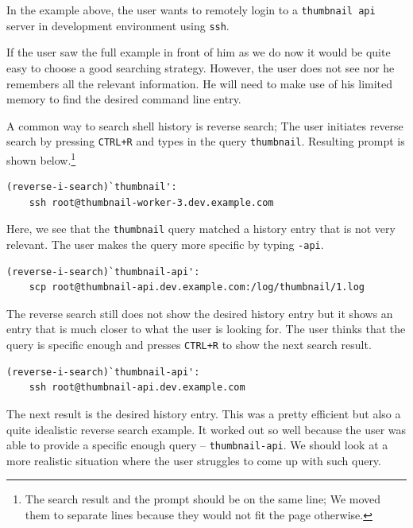 \documentclass[thesis=M,english]{FITthesis}[2012/10/20]
\begin{document}
In the example above, the user wants to remotely login to a \verb|thumbnail api| server in development environment using \verb|ssh|. 

If the user saw the full example in front of him as we do now it would be quite easy to choose a good searching strategy. However, the user does not see nor he remembers all the relevant information. He will need to make use of his limited memory to find the desired command line entry. 

A common way to search shell history is reverse search; The user initiates reverse search by pressing \verb|CTRL+R| and types in the query \verb|thumbnail|. Resulting prompt is shown below.\footnote{The search result and the prompt should be on the same line; We moved them to separate lines because they would not fit the page otherwise.}

\begin{verbatim}
(reverse-i-search)`thumbnail': 
    ssh root@thumbnail-worker-3.dev.example.com
\end{verbatim}

Here, we see that the \verb|thumbnail| query matched a history entry that is not very relevant. The user makes the query more specific by typing \verb|-api|.

\begin{verbatim}
(reverse-i-search)`thumbnail-api': 
    scp root@thumbnail-api.dev.example.com:/log/thumbnail/1.log
\end{verbatim}

The reverse search still does not show the desired history entry but it shows an entry that is much closer to what the user is looking for. The user thinks that the query is specific enough and presses \verb|CTRL+R| to show the next search result.

\begin{verbatim}
(reverse-i-search)`thumbnail-api':
    ssh root@thumbnail-api.dev.example.com
\end{verbatim}

The next result is the desired history entry. This was a pretty efficient but also a quite idealistic reverse search example. It worked out so well because the user was able to provide a specific enough query -- \verb|thumbnail-api|. We should look at a more realistic situation where the user struggles to come up with such query. %
\end{document}
